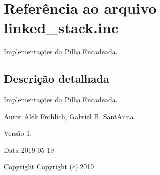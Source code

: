 \hypertarget{linked__stack_8inc}{}\section{Referência ao arquivo linked\+\_\+stack.\+inc}
\label{linked__stack_8inc}


Implementações da Pilha Encadeada.  




\subsection{Descrição detalhada}
Implementações da Pilha Encadeada. 

\begin{DoxyAuthor}{Autor}
Alek Frohlich, Gabriel B. Sant\textquotesingle{}Anna 
\end{DoxyAuthor}
\begin{DoxyVersion}{Versão}
1. 
\end{DoxyVersion}
\begin{DoxyDate}{Data}
2019-\/05-\/19
\end{DoxyDate}
\begin{DoxyCopyright}{Copyright}
Copyright (c) 2019 
\end{DoxyCopyright}
